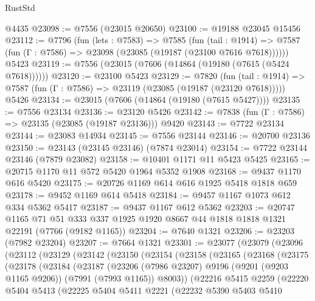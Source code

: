 \begin{lexlean}{RustStd}
\begin{coremodule}
{\begin{coremodule}
{{{{{{{{{{{{{{{{{{{{{{{{{{{{{{{{{{{{{{{{{{{    @4435
@23098 := @7556 (@23015 @20650)
@23100 := @19188 @23045 @15456
@23112 := @7796
    (fun (lets : @7583) =>
    @7585
      (fun (tail : @1914) =>
      @7587 (fun (Γ : @7586) => @23098 (@23085 (@19187 (@23100 @7616 @7618))))))
    @5423
@23119 := @7556 (@23015 (@7606 (@14864 (@19180 (@7615 (@5424 @7618))))))
@23120 := @23100 @5423
@23129 := @7820
    (fun (tail : @1914) => @7587 (fun (Γ : @7586) => @23119 (@23085 (@19187 (@23120 @7618)))))
    @5426
@23134 := @23015 (@7606 (@14864 (@19180 (@7615 @5427))))
@23135 := @7556 @23134
@23136 := @23120 @5426
@23142 := @7838 (fun (Γ : @7586) => @23135 (@23085 (@19187 @23136))) @9420
@23143 := @7722 @23134
@23144 := @23083 @14934
@23145 := @7556 @23144
@23146 := @20700 @23136
@23150 := @23143 (@23145 @23146) (@7874 @23014)
@23154 := @7722 @23144 @23146 (@7879 @23082)
@23158 := @10401 @1171 @11 @5423 @5425
@23165 := @20715 @1170 @11 @572 @5420 @1964 @5352 @1908
@23168 := @9437 @1170 @616 @5420
@23175 := @20726 @1169 @614 @616 @1925 @5418 @1818 @659
@23178 := @9452 @1169 @614 @5418
@23184 := @9457 @1167 @1073 @612 @334 @5362 @5417
@23187 := @9437 @1167 @612 @5362
@23203 := @20747
    @1165
    @71
    @51
    @333
    @337
    @1925
    @1920
    @8667
    @44
    @1818
    @1818
    @1321
    @22191
    (@7766 (@9182 @1165))
@23204 := @7640 @1321
@23206 := @23203 (@7982 @23204)
@23207 := @7664 @1321
@23301 := @23077
    (@23079
      (@23096
        (@23112
          (@23129
            (@23142
              (@23150
                (@23154
                  (@23158
                    (@23165
                      (@23168
                        (@23175
                          (@23178
                            (@23184
                              (@23187
                                (@23206
                                  (@7986 @23207)
                                  @9196
                                  (@9201 (@9203 @1165 @9206))
                                  (@7991 (@7993 @1165))
                                  @8003))
                              (@22216
                                @5415
                                @2259
                                (@22220
                                  @5404
                                  @5413
                                  (@22225
                                    @5404
                                    @5411
                                    @2221
                                    (@22232
                                      @5390
                                      @5403
                                      @5410
}}}}}}}}}}}}}}}}}}}}}}}}}}}}}}}}}}}}}}}}}}}
\end{coremodule}}
\end{coremodule}
\end{lexlean}
